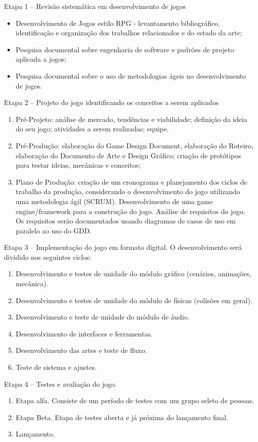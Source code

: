 \documentclass[12pt, 
openright, 
oneside, 
a4paper,    
brazil]{facom-ufu-abntex2}
\begin{document}
Etapa 1 – Revisão sistemática em desenvolvimento de jogos
\begin{itemize}
\item Desenvolvimento de Jogos estilo RPG - levantamento bibliográfico, identificação e organização dos trabalhos relacionados e do estado da arte;
\item Pesquisa documental sobre engenharia de software e padrões de projeto aplicada a jogos;
\item Pesquisa documental sobre o uso de metodologias ágeis no desenvolvimento de jogos.
\end{itemize}

Etapa 2 – Projeto do jogo identificando os conceitos a serem aplicados 
\begin{enumerate}
\item Pré-Projeto: análise de mercado, tendências e viabilidade;
definição da ideia do seu jogo; atividades a serem realizadas;
equipe.
\item Pré-Produção: elaboração do Game Design Document, elaboração do Roteiro, elaboração do Documento de Arte e Design Gráfico; criação de protótipos para testar ideias, mecânicas e conceitos;
\item Plano de Produção: criação de um cronograma e planejamento dos ciclos de trabalho da produção, considerando o desenvolvimento do jogo utilizando uma  metodologia ágil (SCRUM). Desenvolvimento de uma game engine/framework para a construção do jogo. Análise de requisitos do jogo. Os requisitos serão documentados usando diagramas de casos de uso em paralelo ao uso do GDD.
\end{enumerate}

Etapa 3 – Implementação do jogo em formato digital. O desenvolvimento será dividido nos seguintes ciclos:
\begin{enumerate}
\item Desenvolvimento e testes de unidade do módulo gráfico
(cenários, animações, mecânica).
\item Desenvolvimento e testes de unidade do módulo de físicas
(colisões em geral).
\item Desenvolvimento e teste de unidade do módulo de áudio.
\item Desenvolvimento de interfaces e ferramentas.
\item Desenvolvimento das artes e teste de fluxo.
\item Teste de sistema e ajustes.
\end{enumerate}
Etapa 4 – Testes e avaliação do jogo.
\begin{enumerate}
\item Etapa alfa. Consiste de um período de testes com um grupo seleto de pessoas.
\item Etapa Beta. Etapa de testes aberta e já próxima do lançamento final.
\item Lançamento.
\end{enumerate}
\end{document}
